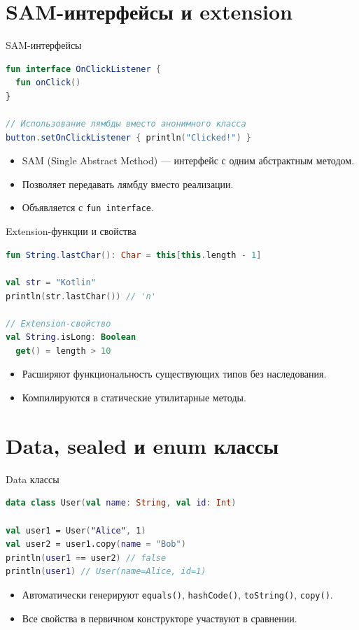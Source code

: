 \documentclass[aspectratio=169]{beamer}
\begin{document}
\section{SAM-интерфейсы и extension}

\begin{frame}[fragile]{SAM-интерфейсы}
  \begin{lstlisting}[language=Kotlin]
fun interface OnClickListener {
  fun onClick()
}

// Использование лямбды вместо анонимного класса
button.setOnClickListener { println("Clicked!") }
  \end{lstlisting}
  \begin{itemize}
    \item SAM (Single Abstract Method) — интерфейс с одним абстрактным методом.
    \item Позволяет передавать лямбду вместо реализации.
    \item Объявляется с \texttt{fun interface}.
  \end{itemize}
\end{frame}

\begin{frame}[fragile]{Extension-функции и свойства}
  \begin{lstlisting}[language=Kotlin]
fun String.lastChar(): Char = this[this.length - 1]

val str = "Kotlin"
println(str.lastChar()) // 'n'

// Extension-свойство
val String.isLong: Boolean
  get() = length > 10
  \end{lstlisting}
  \begin{itemize}
    \item Расширяют функциональность существующих типов без наследования.
    \item Компилируются в статические утилитарные методы.
  \end{itemize}
\end{frame}

\section{Data, sealed и enum классы}

\begin{frame}[fragile]{Data классы}
  \begin{lstlisting}[language=Kotlin]
data class User(val name: String, val id: Int)

val user1 = User("Alice", 1)
val user2 = user1.copy(name = "Bob")
println(user1 == user2) // false
println(user1) // User(name=Alice, id=1)
  \end{lstlisting}
  \begin{itemize}
    \item Автоматически генерируют \texttt{equals()}, \texttt{hashCode()}, \texttt{toString()}, \texttt{copy()}.
    \item Все свойства в первичном конструкторе участвуют в сравнении.
  \end{itemize}
\end{frame}
\end{document}
